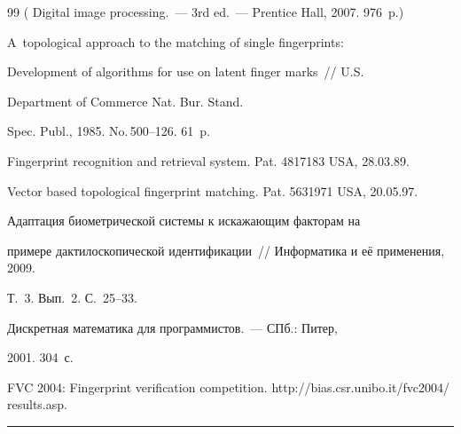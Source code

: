 {{\begin{thebibliography}{99}
( Digital image processing.~--- 3rd ed.~--- Prentice Hall, 2007. 976~p.)







 A~topological approach to the matching of single fingerprints: 


Development of algorithms for use on latent finger marks~/\!\!/ U.S.\


Department of Commerce Nat. Bur. Stand. 


Spec. Publ., 1985. No.\,500--126. 61~p.







 Fingerprint recognition and retrieval system. Pat. 4817183 USA, 28.03.89.




 Vector based topological fingerprint matching. Pat. 5631971 USA, 20.05.97.







 Адаптация биометрической системы к искажающим факторам на 


примере дактилоскопической идентификации~/\!\!/ Информатика и её применения, 2009. 


Т.~3. Вып.~2. С.~25--33.




 Дискретная математика для программистов.~--- СПб.: Питер, 


2001. 304~с.




FVC 2004: Fingerprint verification competition. {\sf http://bias.csr.unibo.it/fvc2004/ results.asp}.


\end{thebibliography}


} }








\vspace*{12pt}





\hrule





